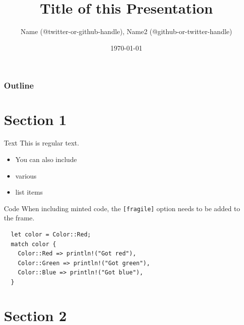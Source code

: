\documentclass[aspectratio=1610,t]{beamer}
\title{Title of this Presentation}
\date{\today}
\author{Name (@twitter-or-github-handle), Name2 (@github-or-twitter-handle)}
\institute{Coredump Rapperswil}
\begin{document}
\maketitle


\begin{frame}
	\frametitle{Outline}
	\setcounter{tocdepth}{1}
	\tableofcontents
\end{frame}



\section{Section 1}

\begin{frame}{Text}
  This is regular text.
  \begin{itemize}
    \item You can also include
    \item various
    \item list items
  \end{itemize}
\end{frame}

\begin{frame}[fragile]{Code}
  When including minted code, the \texttt{[fragile]} option needs to be added to
  the frame.

  \begin{verbatim}
  let color = Color::Red;
  match color {
    Color::Red => println!("Got red"),
    Color::Green => println!("Got green"),
    Color::Blue => println!("Got blue"),
  }
  \end{verbatim}
\end{frame}


\section{Section 2}
\end{document}
